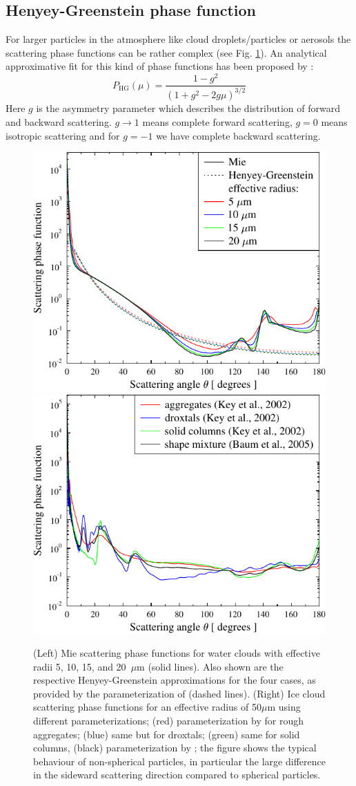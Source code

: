 \documentclass[12pt,twoside,a4paper]{article}
\begin{document}
\subsection{Henyey-Greenstein phase function}

For larger particles in the atmosphere like cloud droplets/particles or
aerosols the scattering phase functions can be rather complex (see
Fig. \ref{fig:phase_functions}).
An analytical approximative fit for this kind of phase
functions has been proposed by \citet{henyey41}:
\begin{equation}
  \label{eq:henyey_greenstein}
  P_\mathrm{HG}(\mu)=\frac{1-g^2}{(1+g^2-2g\mu)^{3/2}}
\end{equation}
Here $g$ is the asymmetry parameter which describes the
distribution of forward and backward scattering. 
$g\rightarrow1$ means complete forward scattering, 
$g=0$ means isotropic scattering and for $g=-1$ we have complete
backward scattering.   
\begin{figure}[htbp]
  \includegraphics[width=.5\hsize]{./figs/phase_functions_water}
  \includegraphics[width=.5\hsize]{./figs/phase_functions_ice}
  \caption{(Left) Mie scattering phase functions for water clouds with
    effective radii 5, 10, 15, and 20~$\mu$m (solid lines). Also shown are
    the respective Henyey-Greenstein approximations for the four
    cases, as provided by the parameterization of \citet{Hu93} (dashed lines).
    (Right) Ice cloud scattering phase
    functions for an effective radius of 50$\mu$m using different
    parameterizations; (red) parameterization by \citet{key2002} for rough
    aggregates; (blue) same but for droxtals; (green) same for solid columns,
    (black) parameterization by \citet{baum05b:_bulk}; the figure shows the
    typical behaviour of non-spherical particles, in particular the
    large difference in the sideward scattering direction compared to
    spherical particles.}
  \label{fig:phase_functions}
\end{figure}
\end{document}
